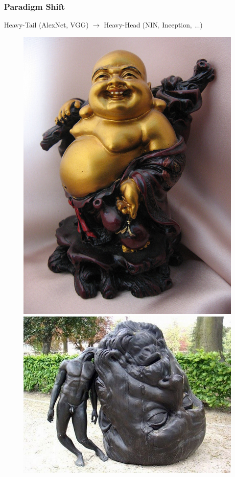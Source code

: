 \documentclass[9pt]{beamer}
\begin{document}
\begin{frame}
	\frametitle{Paradigm Shift}
	\hspace{0.5em}\textcolor{red!70!black}{Heavy-Tail (AlexNet, VGG)} $\rightarrow$ \textcolor{green!70!black}{Heavy-Head (NIN, Inception, ...)}
	\pause
	\begin{figure}
		\includegraphics[scale=0.4]{./figures/edit/heavy-tail.jpg} \hspace{1.5em}
		\includegraphics[scale=0.25]{./figures/edit/heavy-head.jpg} 	
	\end{figure}	
\end{frame}
\end{document}
